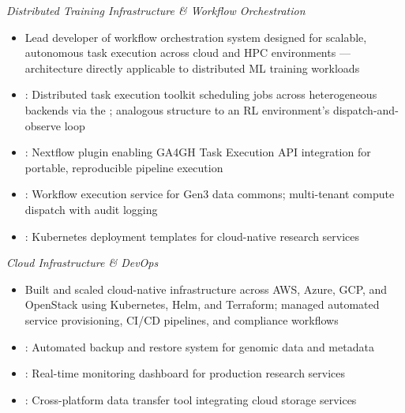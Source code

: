 \vspace{1em}

\emph{Distributed Training Infrastructure \& Workflow Orchestration}

\begin{itemize}
    \item Lead developer of workflow orchestration system designed for scalable, autonomous task execution across cloud and HPC environments --- architecture directly applicable to distributed ML training workloads
    \item {}: Distributed task execution toolkit scheduling jobs across heterogeneous backends via the ; analogous structure to an RL environment's dispatch-and-observe loop
    \item {}: Nextflow plugin enabling GA4GH Task Execution API integration for portable, reproducible pipeline execution
    \item {}: Workflow execution service for Gen3 data commons; multi-tenant compute dispatch with audit logging
    \item {}: Kubernetes deployment templates for cloud-native research services
\end{itemize}

\vspace{1em}

\emph{Cloud Infrastructure \& DevOps}

\begin{itemize}
    \item Built and scaled cloud-native infrastructure across AWS, Azure, GCP, and OpenStack using Kubernetes, Helm, and Terraform; managed automated service provisioning, CI/CD pipelines, and compliance workflows
    \item {}: Automated backup and restore system for genomic data and metadata
    \item {}: Real-time monitoring dashboard for production research services
    \item {}: Cross-platform data transfer tool integrating cloud storage services
\end{itemize}

\newpage

\vspace*{\baselineskip}




\vfill \myBreak{}


